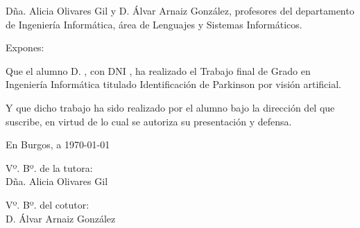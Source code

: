 

\newcommand{\capitulo}[1]{
    \stepcounter{chapter}
    \setcounter{section}{0}
    \setcounter{figure}{0}
    \setcounter{table}{0}
    \chapter*{\thechapter.\enskip #1}
    \addcontentsline{toc}{chapter}{\thechapter.\enskip #1}
    \markboth{#1}{#1}
}





\blankpage
\blankpage

\thispagestyle{empty}
\cabecera

\vfill

\noindent Dña. Alicia Olivares Gil y D. Álvar Arnaiz González, profesores
del departamento de Ingeniería Informática, área de Lenguajes y Sistemas
Informáticos.

\noindent Expones:

\noindent Que el alumno D. \theauthor, con DNI \thedni, ha realizado el
Trabajo final de Grado en Ingeniería Informática titulado Identificación de
Parkinson por visión artificial.

\noindent Y que dicho trabajo ha sido realizado por el alumno bajo la
dirección del que suscribe, en virtud de lo cual se autoriza su presentación
y defensa.

\begin{center}
    En Burgos, a {\large \today}
\end{center}

\vfill\vfill\vfill

\begin{minipage}{0.45\textwidth}
    \begin{flushleft}
        Vº. Bº. de la tutora:\\[2cm]
        Dña. Alicia Olivares Gil
    \end{flushleft}
\end{minipage}
\hfill
\begin{minipage}{0.45\textwidth}
    \begin{flushleft}
        Vº. Bº. del cotutor:\\[2cm]
        D. Álvar Arnaiz González
    \end{flushleft}
\end{minipage}

\hfill
\vfill


